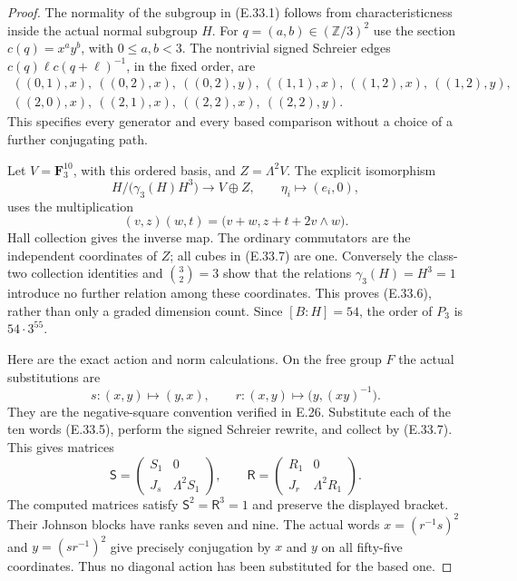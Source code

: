\begin{proof}
The normality of the subgroup in \textup{(E.33.1)} follows
from characteristicness inside the actual normal subgroup
$H$.  For $q=(a,b)\in(\mathbb Z/3)^2$ use the section
$c(q)=x^ay^b$, with $0\leq a,b<3$.  The nontrivial signed
Schreier edges
$c(q)\ell c(q+\ell)^{-1}$, in the fixed order, are
\[
 \begin{gathered}
 ((0,1),x),\ ((0,2),x),\ ((0,2),y),\
 ((1,1),x),\ ((1,2),x),\ ((1,2),y),\\
 ((2,0),x),\ ((2,1),x),\ ((2,2),x),\ ((2,2),y).
 \end{gathered}
 \tag{E.33.5}
\]
This specifies every generator and every based comparison
without a choice of a further conjugating path.

Let $V=\mathbf F_3^{10}$, with this ordered basis, and
$Z=\Lambda^2V$.  The explicit isomorphism
\[
 H/\bigl(\gamma_3(H)H^3\bigr)\longrightarrow V\oplus Z,
 \qquad \eta_i\longmapsto(e_i,0),
 \tag{E.33.6}
\]
uses the multiplication
\[
 (v,z)(w,t)=\bigl(v+w,z+t+2v\wedge w\bigr).
 \tag{E.33.7}
\]
Hall collection gives the inverse map.  The ordinary
commutators are the independent coordinates of $Z$;
all cubes in \textup{(E.33.7)} are one.  Conversely the
class-two collection identities and
$\binom32=3$ show that the relations $\gamma_3(H)=H^3=1$
introduce no further relation among these coordinates.
This proves \textup{(E.33.6)}, rather than only a graded
dimension count.  Since $[B:H]=54$, the order of $P_3$
is $54\cdot3^{55}$.

Here are the exact action and norm calculations.  On the
free group $F$ the actual substitutions are
\[
 s:(x,y)\longmapsto(y,x),\qquad
 r:(x,y)\longmapsto\bigl(y,(xy)^{-1}\bigr).
 \tag{E.33.8}
\]
They are the negative-square convention verified in E.26.
Substitute each of the ten words \textup{(E.33.5)}, perform
the signed Schreier rewrite, and collect by
\textup{(E.33.7)}.  This gives matrices
\[
 \mathsf S=
 \begin{pmatrix}S_1&0\\J_s&\Lambda^2S_1\end{pmatrix},
 \qquad
 \mathsf R=
 \begin{pmatrix}R_1&0\\J_r&\Lambda^2R_1\end{pmatrix}.
 \tag{E.33.9}
\]
The computed matrices satisfy
$\mathsf S^2=\mathsf R^3=1$ and preserve the displayed
bracket.  Their Johnson blocks have ranks seven and nine.
The actual words $x=(r^{-1}s)^2$ and
$y=(sr^{-1})^2$ give precisely conjugation by $x$ and $y$
on all fifty-five coordinates.  Thus no diagonal action
has been substituted for the based one.


\end{proof}
